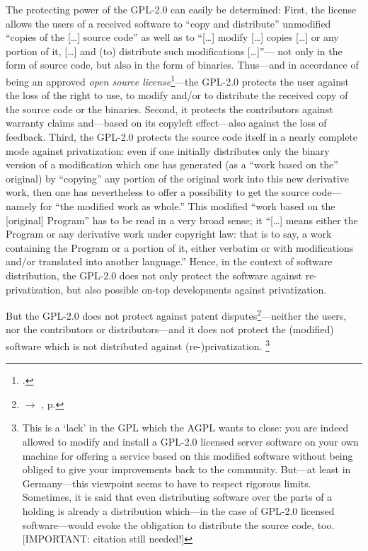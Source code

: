 The protecting power of the GPL-2.0 can easily be determined: First, the license
allows the users of a received software to \enquote{copy and distribute}
unmodified \enquote{copies of the [\ldots] source code} as well
as to \enquote{[\ldots] modify [\ldots] copies [\ldots] or any portion of it,
[\ldots] and (to) distribute such modifications [\ldots]}---%
not only in the form of source code, but also in the form of
binaries. Thus---and in accordance of being an approved
\emph{open source license}\footcite[cf.][\nopage wp]{OSI2012b}---the GPL-2.0
protects the user against the loss of the right to use, to modify and/or to
distribute the received copy of the source code or the binaries. Second, it
protects the contributors against warranty claims
and---based on its copyleft effect---also against the
loss of feedback. Third, the GPL-2.0 protects the source code itself in a nearly
complete mode against privatization: even if one initially distributes only the
binary version of a modification which one has generated (as a \enquote{work
based on the} original) by \enquote{copying} any {portion} of the original work
into this new derivative work, then one has nevertheless to offer
a possibility to get the source code---namely for \enquote{the
modified work as whole.} This modified \enquote{work based on the
[original] Program} has to be read in a very broad sense; it \enquote{[\ldots]
means either the Program or any derivative work under copyright law: that is to
say, a work containing the Program or a portion of it, either verbatim or with
modifications and/or translated into another language.} Hence, in
the context of software distribution, the GPL-2.0 does not only protect the
software against re-privatization, but also possible on-top developments against
privatization. 

But the GPL-2.0 does not protect against patent disputes\footnote{$\rightarrow$
\oslic, p. }---neither the users, nor the
contributors or distributors---and it does not protect the (modified) software
which is not distributed against (re-)privatization.%
  \footnote{This is a `lack' in the GPL which the AGPL wants to close: you are
  indeed allowed to modify and install a GPL-2.0 licensed server software on
  your own machine for offering a service based on this modified software
  without being obliged to give your improvements back to the
  community. But---at least in Germany---this viewpoint seems to have to respect
  rigorous limits. Sometimes, it is said that even distributing software over
  the parts of a holding is already a distribution which---in the case of 
  GPL-2.0 licensed software---would evoke the obligation to distribute the
  source code, too. [IMPORTANT: citation still needed!]}

